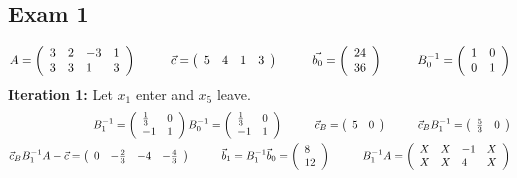 \subsection{Exam 1}
\begin{equation*}
A = \left(
\begin{array}{llll}
 3 & 2 & -3 & 1 \\
 3 & 3 & 1 & 3
\end{array}
\right)
\hspace{1cm}
\vec{c} = \left(
\begin{array}{llll}
 5 & 4 & 1 & 3
\end{array}
\right)
\hspace{1cm}
\vec{b_0} = \left(
\begin{array}{l}
 24 \\
 36
\end{array}
\right)
\hspace{1cm}
B_0^{-1} = \left(
\begin{array}{ll}
 1 & 0 \\
 0 & 1
\end{array}
\right)
\end{equation*}
\textbf{Iteration 1:}  Let $x_1$ enter and $x_5$ leave.
\begin{align*}
B_1^{-1} =  \left(
\begin{array}{ll}
 \frac{1}{3} & 0 \\
 -1 & 1
\end{array}
\right)  B_0^{-1}=  \left(
\begin{array}{ll}
 \frac{1}{3} & 0 \\
 -1 & 1
\end{array}
\right)
\cm
\vec{c}_B = \left(
\begin{array}{ll}
  5 & 0
\end{array}
\right)
\cm
\vec{c}_B B_1^{-1} = \left(
\begin{array}{ll}
 \frac{5}{3} & 0
\end{array}
\right)
\\ %
\vec{c}_B B_1^{-1} A - \vec{c} = \left(
\begin{array}{llll}
 0 & -\frac{2}{3} & -4 & -\frac{4}{3}
\end{array}
\right)
\cm
\vec{b}_1 = B_1^{-1}\vec{b}_0 = \left(
\begin{array}{l}
 8 \\
 12
\end{array}
\right)
\cm
B_1^{-1}A = \left(
\begin{array}{llll}
 X & X & -1 & X \\
 X & X & 4 & X
\end{array}
\right)
\end{align*}
